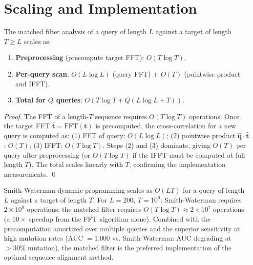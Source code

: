 \section{Scaling and Implementation}
\label{sec:interference_scaling}

\begin{proposition}
\label{prop:linear_scaling}
The matched filter analysis of a query of length $L$ against a target of
length $T \geq L$ scales as:
\begin{enumerate}[label=(\roman*)]
  \item \textbf{Preprocessing} (precompute target FFT): $O(T \log T)$.
  \item \textbf{Per-query scan}: $O(L \log L)$ (query FFT) $+$ $O(T)$ (pointwise product and IFFT).
  \item \textbf{Total for $Q$ queries}: $O(T \log T + Q(L \log L + T))$.
\end{enumerate}
\end{proposition}

\begin{proof}
The FFT of a length-$T$ sequence requires $O(T \log T)$ operations. Once the
target FFT $\hat{\mathbf{t}} = \mathrm{FFT}(\mathbf{t})$ is precomputed, the
cross-correlation for a new query is computed as:
(1) FFT of query: $O(L \log L)$; (2) pointwise product
$\overline{\hat{\mathbf{q}}} \cdot \hat{\mathbf{t}}$: $O(T)$; (3) IFFT: $O(T \log T)$.
Steps (2) and (3) dominate, giving $O(T)$ per query after preprocessing (or
$O(T \log T)$ if the IFFT must be computed at full length $T$). The total
scales linearly with $T$, confirming the implementation measurements. \qed
\end{proof}

\begin{remark}
Smith-Waterman dynamic programming scales as $O(LT)$ for a query of length $L$
against a target of length $T$. For $L = 200$, $T = 10^6$: Smith-Waterman
requires $2 \times 10^8$ operations; the matched filter requires $O(T \log T)
\approx 2 \times 10^7$ operations (a $10\times$ speedup from the FFT algorithm
alone). Combined with the precomputation amortized over multiple queries and the
superior sensitivity at high mutation rates (AUC $= 1.000$ vs. Smith-Waterman
AUC degrading at $> 30\%$ mutation), the matched filter is the preferred
implementation of the optimal sequence alignment method.
\end{remark}

